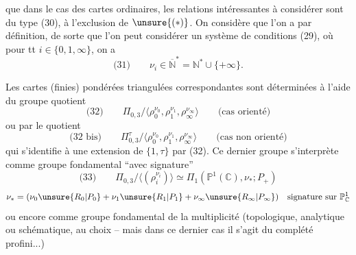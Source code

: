 que dans le cas des cartes ordinaires, les relations intéressantes à considérer sont du type (30), à l'exclusion de $\unsure{(*)}$.  On considère que l'on a  par définition, de sorte que l'on peut considérer un système de conditions (29), où pour tt $i\in\{0,1,\infty\}$, on a
\[
\text{(31)}\qquad \nu_i\in\overline{\mathbb N}^{*}=\mathbb N^{*}\cup\{+\infty\}.
\]

Les cartes (finies) pondérées triangulées correspondantes sont déterminées à l'aide du groupe quotient
\[
\text{(32)}\qquad
\Pi_{0,3}/\langle\rho_0^{\nu_0},\rho_1^{\nu_1},\rho_\infty^{\nu_\infty}\rangle
\qquad\text{(cas orienté)}
\]
ou par le quotient
\[
\text{(32 bis)}\qquad
\Pi_{0,3}^{\tau}/\langle\rho_0^{\nu_0},\rho_1^{\nu_1},\rho_\infty^{\nu_\infty}\rangle
\qquad\text{(cas non orienté)}
\]
qui s'identifie à une extension de $\{1,\tau\}$ par (32). Ce dernier groupe s'interprète comme groupe fondamental ``avec signature''
\[
\text{(33)}\qquad
\Pi_{0,3}/\langle(\rho_i^{\nu_i})\rangle
\simeq\Pi_1(\mathbb P^1(\mathbb C),\nu_*;P_+)
\]
\[
\nu_*=(\nu_0\unsure{R_0|P_0}+\nu_1\unsure{R_1|P_1}+\nu_\infty\unsure{R_\infty|P_\infty})
\quad\text{signature sur }\mathbb P^1_{\mathbb C}
\]
ou encore comme groupe fondamental de la multiplicité (topologique, analytique ou schématique, au choix -- mais dans ce dernier cas il s'agit du complété profini...)
